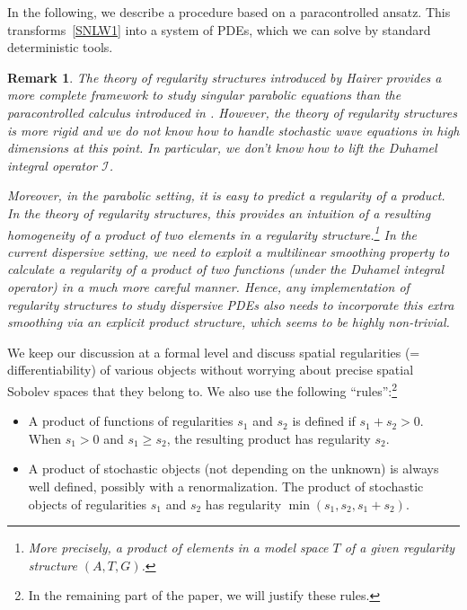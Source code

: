 \documentclass[%
11pt,  reqno]{amsart}
\newtheorem{remark}[theorem]{Remark}
\newcommand{\1}{\hspace{0.2mm}\text{I}\hspace{0.2mm}}
\newcommand{\I}{\mathcal{I}}
\numberwithin{equation}{section}
\numberwithin{theorem}{section}
\begin{document}
\medskip

In the following, we describe a procedure based on a paracontrolled ansatz.
This  transforms~\eqref{SNLW1}
into a system of PDEs, 
which we can solve by standard deterministic tools.


\begin{remark}\rm
The theory of regularity structures introduced by Hairer \cite{Hairer}
provides a more complete framework
to study singular parabolic equations than the paracontrolled calculus
introduced in \cite{GIP}.
However, 
the theory of regularity structures
 is more rigid and we do not know how to handle
 stochastic wave equations in high dimensions at this point.
 In particular, 
 we don't know how to lift the Duhamel integral operator $\I$.

Moreover, in the parabolic setting, it is easy to predict a regularity of a product.
In the theory of regularity structures, 
this  provides an intuition of a resulting homogeneity 
of a product of two elements in a regularity structure.\footnote{More precisely, 
a product of elements in a model space $T$ of a given regularity structure $(A, T, G)$.}
In the current dispersive setting, 
we need to exploit a multilinear smoothing property
to calculate a regularity of a product
of two functions (under the Duhamel integral operator)
in a much more careful manner.
Hence, any implementation of regularity structures
to study dispersive PDEs also needs to incorporate
this extra smoothing via an explicit product structure, 
which seems to be highly non-trivial.
\end{remark}

We keep our discussion 
at a formal level
and discuss spatial regularities (= differentiability) of various objects
without worrying about precise spatial Sobolev spaces that they belong to.
We also use the following ``rules'':\footnote{In the remaining part of the paper, 
we will justify these rules.}


\begin{itemize}

\item A product of functions of regularities $s_1$ and $s_2$
is defined if $s_1 + s_2 > 0$.
When $s_1 > 0$ and $s_1 \geq s_2$, the resulting product has regularity $s_2$.

\item A product of stochastic objects (not depending on the unknown)
is always well defined, possibly with a renormalization.
The product of stochastic objects of regularities $s_1$ and $s_2$
has regularity $\min( s_1, s_2, s_1 + s_2)$.

\end{itemize}
\end{document}
